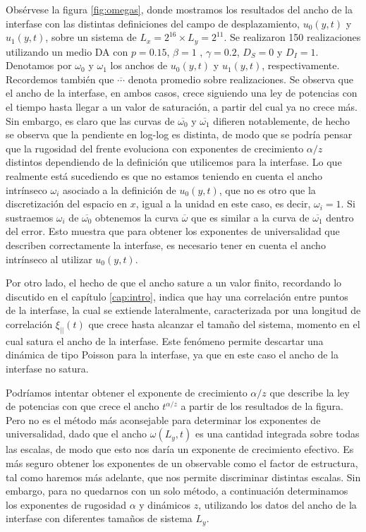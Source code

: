 Obsérvese la figura \ref{fig:omegas}, donde mostramos los resultados del ancho de la interfase con las distintas definiciones del campo de desplazamiento, $u_0(y,t)$ y $u_1(y,t)$, sobre un sistema de $L_x = 2^{16} \times L_y = 2^{11}$. Se realizaron 150 realizaciones utilizando un medio DA con $p=0.15$, $\beta = 1$ , $\gamma = 0.2$, $D_S = 0$ y $D_I=1$. Denotamos por $\omega_0$ y $\omega_1$ los anchos de $u_0(y,t)$ y $u_1(y,t)$, respectivamente. Recordemos también que $\overline{\cdots}$ denota promedio sobre realizaciones. Se observa que el ancho de la interfase, en ambos casos, crece siguiendo una ley de potencias con el tiempo hasta llegar a un valor de saturación, a partir del cual ya no crece más. Sin embargo, es claro que las curvas de $\overline{\omega_0}$ y $\overline{\omega_1}$ difieren notablemente, de hecho se observa que la pendiente en log-log es distinta, de modo que se podría pensar que la rugosidad del frente evoluciona con exponentes de crecimiento $\alpha/z$ distintos dependiendo de la definición que utilicemos para la interfase. Lo que realmente está sucediendo es que no estamos teniendo en cuenta el ancho intrínseco $\omega_i$ \cite{barabasi,kertesz1988noise,wolf1987surface} asociado a la definición de $u_0(y,t)$, que no es otro que la discretización del espacio en $x$, igual a la unidad en este caso, es decir, $\omega_i = 1$. Si sustraemos $\omega_i$ de $\overline{\omega_0}$ obtenemos la curva $\overline{\omega}$ que es similar a la curva de $\overline{\omega_1}$ dentro del error. Esto muestra que para obtener los exponentes de universalidad que describen correctamente la interfase, es necesario tener en cuenta el ancho intrínseco al utilizar $u_0(y,t)$. 

Por otro lado, el hecho de que el ancho sature a un valor finito, recordando lo discutido en el capítulo \ref{cap:intro}, indica que hay una correlación entre puntos de la interfase, la cual se extiende lateralmente, caracterizada por una longitud de correlación $\xi_{||}(t)$ que crece hasta alcanzar el tamaño del sistema, momento en el cual satura el ancho de la interfase. Este fenómeno permite descartar una dinámica de tipo Poisson para la interfase, ya que en este caso el ancho de la interfase no satura.

Podríamos intentar obtener el exponente de crecimiento $\alpha/z$ que describe la ley de potencias con que crece el ancho $t^{\alpha/z}$ a partir de los resultados de la figura. Pero no es el método más aconsejable para determinar los exponentes de universalidad, dado que el ancho $\omega(L_y,t)$ es una cantidad integrada sobre todas las escalas, de modo que esto nos daría un exponente de crecimiento efectivo. Es más seguro obtener los exponentes de un observable como el factor de estructura, tal como haremos más adelante, que nos permite discriminar distintas escalas. Sin embargo, para no quedarnos con un solo método, a continuación determinamos los exponentes de rugosidad $\alpha$ y dinámicos $z$, utilizando los datos del ancho de la interfase con diferentes tamaños de sistema $L_y$.


